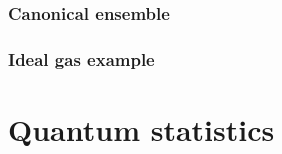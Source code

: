 \documentclass[letter-paper]{tufte-book}
\begin{document}

\subsection{Canonical ensemble}


\subsection{Ideal gas example}


\chapter{Quantum statistics}










\mainmatter




%


\end{document}
